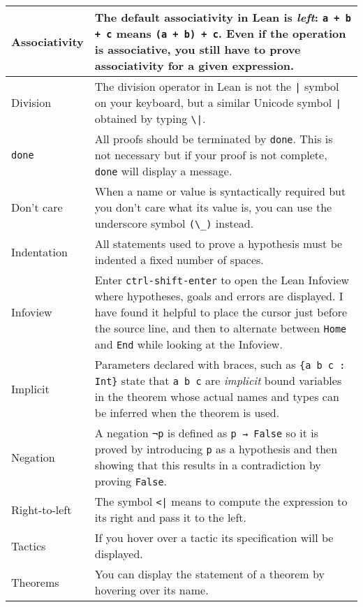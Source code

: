 \begin{tabular}{p{}|@{\hspace{1em}}p{}}
\hline
Associativity&The default associativity in Lean is \emph{left}: \verb!a + b + c! means \verb!(a + b) + c!. Even if the operation is associative, you still have to prove associativity for a given expression.\\\hline

Division&The division operator in Lean is not the \Verb+|+ symbol on your keyboard, but a similar Unicode symbol \Verb+∣+ obtained by typing \Verb+\|+.\\\hline

\Verb+done+&All proofs should be terminated by \Verb+done+. This is not necessary but if your proof is not complete, \Verb+done+ will display a message.\\\hline

Don't care&When a name or value is syntactically required but you don't care what its value is, you can use the underscore symbol \Verb+(\_)+ instead.\\\hline

Indentation&All statements used to prove a hypothesis must be indented a fixed number of spaces.\\\hline

Infoview&Enter \Verb+ctrl-shift-enter+ to open the Lean Infoview where hypotheses, goals and errors are displayed. I have found it helpful to place the cursor just before the source line, and then to alternate between \Verb+Home+ and \Verb+End+ while looking at the Infoview.\\\hline

Implicit&Parameters declared with braces, such as \Verb+{a b c : Int}+ state that \Verb+a b c+ are \emph{implicit} bound variables in the theorem whose actual names and types can be inferred when the theorem is used.\\\hline

Negation&A negation \Verb+¬p+ is defined as \Verb+p → False+ so it is proved by introducing \Verb+p+ as a hypothesis and then showing that this results in a contradiction by proving \Verb+False+.\\\hline

Right-to-left&The symbol \Verb+<|+ means to compute the expression to its right and pass it to the left.\\\hline

Tactics&If you hover over a tactic its specification will be displayed.\\\hline

Theorems&You can display the statement of a theorem by hovering over its name.\\\hline
\end{tabular}


